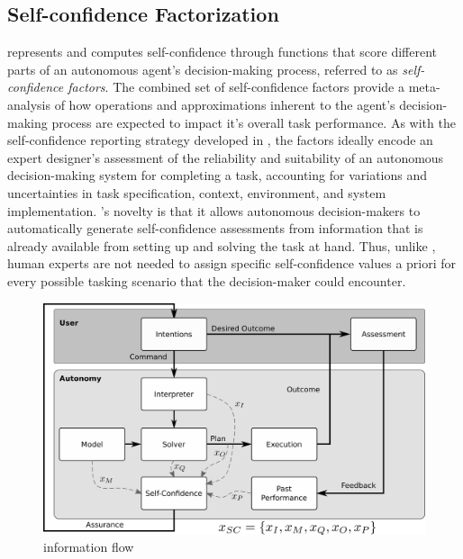 \subsection{Self-confidence Factorization} \label{sec:self-confidence}

\famsec{} represents and computes self-confidence through functions that score different parts of an autonomous agent's decision-making process, referred to as \emph{self-confidence factors}. The combined set of self-confidence factors provide a meta-analysis of how operations and approximations inherent to the agent's decision-making process are expected to impact it's overall task performance. 
As with the self-confidence reporting strategy developed in \cite{Hutchins2015-if}, the factors ideally encode an expert designer's assessment of the reliability and suitability of an autonomous decision-making system for completing a task, accounting for variations and uncertainties in task specification, context, environment, and system implementation. \famsec{}'s novelty is that it allows autonomous decision-makers to automatically generate self-confidence assessments from information that is already available from setting up and solving the task at hand. Thus, unlike \cite{Hutchins2015-if}, human experts are not needed to assign specific self-confidence values a priori for every possible tasking scenario that the decision-maker could encounter. %
    
    
\begin{figure}[tbp]
        \centering
        \includegraphics[width=0.85\linewidth]{Figures/FaMSeC.png}
        \caption{\famsec{} information flow}
        \label{fig:famsec}
        \vspace{-0.5 cm}
\end{figure}
    
